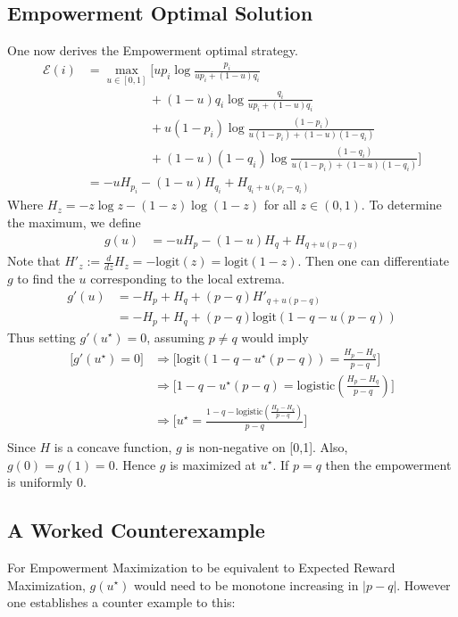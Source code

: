 \documentclass{article}
\newcommand{\Ee}{\mathcal{E}}
\begin{document}
\subsection*{Empowerment Optimal Solution}
One now derives the Empowerment optimal strategy. 
\begin{align*}
\Ee(i) 
	&= \max_{u\in [0,1]}\bigg[up_i \log \frac{p_i}{up_i+(1-u)q_i}\\
	&\hspace{5em} + (1-u)q_i \log \frac{q_i}{up_i+(1-u)q_i}\\
	&\hspace{5em} + u(1-p_i) \log \frac{(1-p_i)}{u(1-p_i)+(1-u)(1-q_i)}\\
	&\hspace{5em} + (1-u)(1-q_i) \log \frac{(1-q_i)}{u(1-p_i)+(1-u)(1-q_i)}\bigg]\\
	&=-uH_{p_i}-(1-u)H_{q_i}+H_{q_i+u(p_i-q_i)}
\end{align*}
Where $H_z=-z\log z - (1-z)\log(1-z)$ for all $z\in (0,1)$. To determine the maximum, we define 
\begin{align*}
g(u)&= -uH_{p}-(1-u)H_{q}+H_{q+u(p-q)} 
\end{align*}
Note that $H'_z:=\frac{d}{dz} H_z= -\text{logit}(z)=\text{logit}(1-z)$.
Then one can differentiate $g$ to find the $u$ corresponding to the local extrema.
\begin{align*}
g'(u) 
	&= -H_p + H_q + (p-q)H'_{q+u(p-q)}\\
	&= -H_p + H_q +(p-q)\text{logit}(1-q-u(p-q))
\end{align*}
Thus setting $g'(u^\star)=0$, assuming $p\neq q$ would imply
\begin{align*}
\bigg[g'(u^\star)=0\bigg]
	&\Rightarrow\bigg[\text{logit}(1-q-u^\star(p-q)) = \frac{H_{p}-H_{q}}{p-q}\bigg]\\
	&\Rightarrow\bigg[1-q-u^\star(p-q) = \text{logistic}\left(\frac{H_{p}-H_{q}}{p-q}\right)\bigg]\\
	&\Rightarrow\bigg[u^\star=\frac{1-q-\text{logistic}\left(\frac{H_{p}-H_{q}}{p-q}\right)}{p-q} \bigg]\\
\end{align*}
Since $H$ is a concave function, $g$ is non-negative on [0,1]. Also, $g(0)=g(1)=0$. Hence $g$ is maximized at $u^\star$. If $p=q$ then the empowerment is uniformly $0$.

\subsection{A Worked Counterexample}
For Empowerment Maximization to be equivalent to Expected Reward Maximization, $g(u^\star)$ would need to be monotone increasing in $|p-q|$. However one establishes a counter example to this: 
\end{document}
